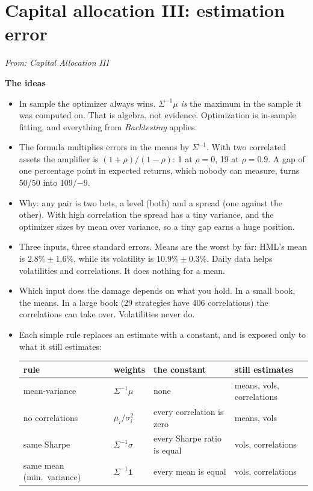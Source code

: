 \documentclass[11pt]{article}
\newcounter{ex}[section]
\newcommand{\head}[1]{\par\medskip\textbf{#1}\par}
\begin{document}
\section{Capital allocation III: estimation error}
{\small\emph{From: Capital Allocation III}}

\head{The ideas}
\begin{itemize}
\item In sample the optimizer always wins. $\Sigma^{-1}\mu$ \emph{is} the maximum in the sample it was computed on. That
is algebra, not evidence. Optimization is in-sample fitting, and everything from \emph{Backtesting} applies.
\item The formula multiplies errors in the means by $\Sigma^{-1}$. With two correlated assets the amplifier is
$(1+\rho)/(1-\rho)$: 1 at $\rho = 0$, 19 at $\rho = 0.9$. A gap of one percentage point in expected returns, which
nobody can measure, turns 50/50 into 109/$-9$.
\item Why: any pair is two bets, a level (both) and a spread (one against the other). With high correlation the spread
has a tiny variance, and the optimizer sizes by mean over variance, so a tiny gap earns a huge position.
\item Three inputs, three standard errors. Means are the worst by far: HML's mean is $2.8\% \pm 1.6\%$, while its
volatility is $10.9\% \pm 0.3\%$. Daily data helps volatilities and correlations. It does nothing for a mean.
\item Which input does the damage depends on what you hold. In a small book, the means. In a large book (29 strategies
have 406 correlations) the correlations can take over. Volatilities never do.
\item Each simple rule replaces an estimate with a constant, and is exposed only to what it still estimates:
\begin{center}
{\small\begin{tabular}{@{}llll@{}}
\toprule
rule & weights & the constant & still estimates \\
\midrule
mean-variance & $\Sigma^{-1}\mu$ & none & means, vols, correlations \\
no correlations & $\mu_{i}/\sigma_{i}^{2}$ & every correlation is zero & means, vols \\
same Sharpe & $\Sigma^{-1}\sigma$ & every Sharpe ratio is equal & vols, correlations \\
same mean (min.\ variance) & $\Sigma^{-1}\mathbf{1}$ & every mean is equal & vols, correlations \\

\end{tabular}}
\end{center}
\end{itemize}
\end{document}
